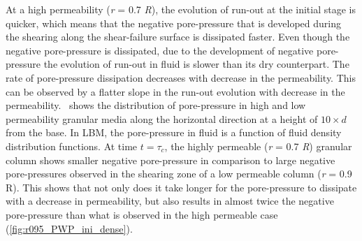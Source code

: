 At a high permeability (\textit{r} = 0.7 \textit{R}), the evolution of run-out 
at the initial 
stage is quicker, which means that the negative pore-pressure that is developed 
during the shearing along the shear-failure surface is dissipated faster. Even 
though the negative pore-pressure is dissipated, due to 
the development of negative pore-pressure the evolution of run-out in fluid is 
slower than its dry counterpart. The rate of pore-pressure dissipation 
decreases with decrease in the permeability. This can be observed by a flatter 
slope in the run-out evolution with decrease in the 
permeability.~ shows 
the distribution of pore-pressure in high and low permeability granular media 
along the horizontal direction at a height of $10 \times d$ from the base. In 
LBM, the pore-pressure in fluid is a function of fluid density distribution 
functions. 
At time $t = \tau_c$, the highly permeable (\textit{r} = 0.7 \textit{R}) 
granular column 
shows smaller negative pore-pressure in comparison to large negative 
pore-pressures observed in the shearing zone of a low permeable column 
(\textit{r} = 0.9 
R). This shows that not only does it take longer for the pore-pressure to 
dissipate with a decrease in permeability, but also results in almost twice the 
negative pore-pressure than what is observed in the high permeable case 
(\cref{fig:r095_PWP_ini_dense}).

